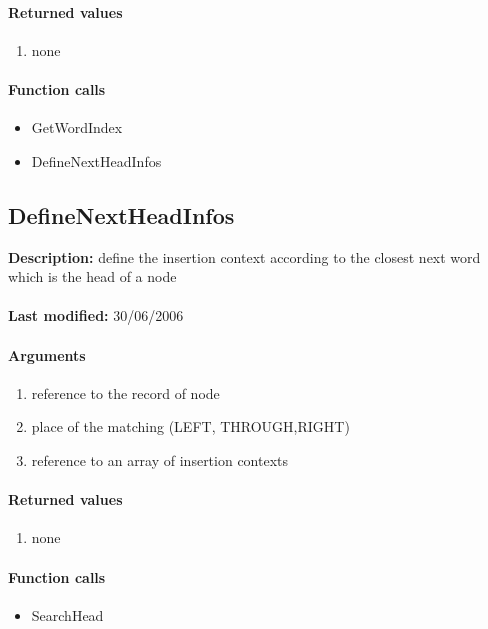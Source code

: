 \paragraph{Returned values}
\begin{enumerate}
\item none
\end{enumerate}

\paragraph{Function calls}
\begin{itemize}
\item GetWordIndex
\item DefineNextHeadInfos
\end{itemize}

\subsection{DefineNextHeadInfos}
\textbf{Description:} define the insertion context according to the closest next word which is the head of a node\\
\\\textbf{Last modified:} 30/06/2006

\paragraph{Arguments}
\begin{enumerate}
\item reference to the record of node
\item place of the matching (LEFT, THROUGH,RIGHT)
\item reference to an array of insertion contexts
\end{enumerate}

\paragraph{Returned values}
\begin{enumerate}
\item none
\end{enumerate}

\paragraph{Function calls}
\begin{itemize}
\item SearchHead
\end{itemize}

